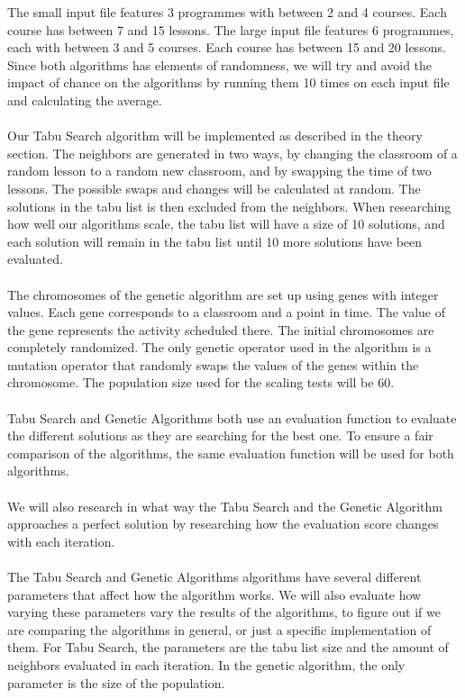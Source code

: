 \documentclass[titlepage,a4paper]{article}
\begin{document}
The small input file features 3 programmes with between 2 and 4 courses. Each course has between 7 and 15 lessons.
The large input file features 6 programmes, each with between 3 and 5 courses. Each course has between 15 and 20 lessons.
Since both algorithms has elements of randomness, we will try and avoid the impact of chance on the algorithms by running them 10 times on each input file and calculating the average. \\\\
Our Tabu Search algorithm will be implemented as described in the theory section. The neighbors are generated in two ways, by changing the classroom of a random lesson to a random new classroom, and by swapping the time of two lessons. The possible swaps and changes will be calculated at random. The solutions in the tabu list is then excluded from the neighbors. When researching how well our algorithms scale, the tabu list will have a size of 10 solutions, and each solution will remain in the tabu list until 10 more solutions have been evaluated. \\\\
The chromosomes of the genetic algorithm are set up using genes with integer values. Each gene corresponds to a classroom and a point in time. The value of the gene represents the activity scheduled there. The initial chromosomes are completely randomized. The only genetic operator used in the algorithm is a mutation operator that randomly swaps the values of the genes within the chromosome. The population size used for the scaling tests will be 60. \\\\
Tabu Search and Genetic Algorithms both use an evaluation function to evaluate the different solutions as they are searching for the best one. To ensure a fair comparison of the algorithms, the same evaluation function will be used for both algorithms. \\\\
We will also research in what way the Tabu Search and the Genetic Algorithm approaches a perfect solution by researching how the evaluation score changes with each iteration. \\\\
The Tabu Search and Genetic Algorithms algorithms have several different parameters that affect how the algorithm works. We will also evaluate how varying these parameters vary the results of the algorithms, to figure out if we are comparing the algorithms in general, or just a specific implementation of them.
For Tabu Search, the parameters are the tabu list size and the amount of neighbors evaluated in each iteration. 
In the genetic algorithm, the only parameter is the size of the population.
\end{document}
